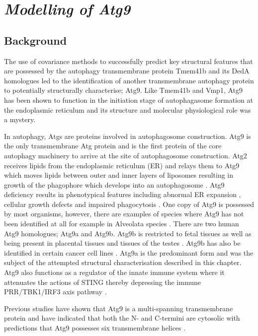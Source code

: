 \chapter{\emph{Modelling of Atg9}}
\section{Background}
The use of covariance methods to successfully predict key structural features that are possessed by the autophagy transmembrane protein Tmem41b and its DedA homologues led to the identification of another transmembrane autophagy protein to potentially structurally characterise; Atg9.  Like Tmem41b and Vmp1, Atg9 has been shown to function in the initiation stage of autophagasome formation at the endoplasmic reticulum \cite{Zhuang2017} and its structure and molecular physiological role was a mystery.

In autophagy, Atgs are proteins involved in autophagosome construction.  Atg9 is the only transmembrane Atg protein and is the first protein of the core autophagy machinery to arrive at the site of autophagosome construction.  Atg2 receives lipids from the endoplasmic reticulum (ER) and relays them to Atg9 which moves lipids between outer and inner layers of liposomes  resulting in growth of the phagophore which develops into an autophagosome \cite{sawa2020reconstitution,yamamoto2012atg9}.  Atg9 deficiency results in phenotypical features including abnormal ER expansion \cite{zhuang2017atg9}, cellular growth defects and impaired phagocytosis \cite{tung2010loss}. One copy of Atg9 is possessed by most organisms, however, there are examples of species where Atg9 has not been identified at all for example in Alveolata species \cite{aslan2017comparative,rigden2009autophagy}. There are two human Atg9 homologues; Atg9a and Atg9b.  Atg9b is restricted to fetal tissues as well as being present in placental tissues and tissues of the testes \cite{kusama2009comprehensive}. Atg9b has also be identified in certain cancer cell lines \cite{ma2017role,yun2020wnt}.  Atg9a is the predominant form and was the subject of the attempted structural characterisation described in this chapter.  Atg9 also functions as a regulator of the innate immune system where it attenuates the actions of STING thereby depressing the immune PRR/TBK1/IRF3 axis pathway \cite{imanishi2019reciprocal}.

Previous studies have shown that Atg9 is a multi-spanning transmembrane protein and have indicated that both the N- and C-termini are cytosolic with predictions that Atg9 possesses six transmembrane helices \cite{Young2006}. 


